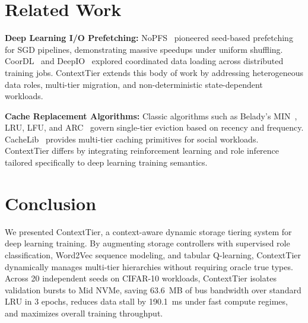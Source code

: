 \documentclass[conference]{IEEEtran}
\begin{document}
\section{Related Work}
\label{sec:related}
\textbf{Deep Learning I/O Prefetching:} NoPFS~\cite{dryden2021clairvoyant} pioneered seed-based prefetching for SGD pipelines, demonstrating massive speedups under uniform shuffling. CoorDL~\cite{coordl2021} and DeepIO~\cite{zhu2018deepio} explored coordinated data loading across distributed training jobs. ContextTier extends this body of work by addressing heterogeneous data roles, multi-tier migration, and non-deterministic state-dependent workloads.

\textbf{Cache Replacement Algorithms:} Classic algorithms such as Belady's MIN~\cite{belady1966study}, LRU, LFU, and ARC~\cite{megiddo2003arc} govern single-tier eviction based on recency and frequency. CacheLib~\cite{cachelib2020} provides multi-tier caching primitives for social workloads. ContextTier differs by integrating reinforcement learning and role inference tailored specifically to deep learning training semantics.

\section{Conclusion}
\label{sec:conclusion}
We presented ContextTier, a context-aware dynamic storage tiering system for deep learning training. By augmenting storage controllers with supervised role classification, Word2Vec sequence modeling, and tabular Q-learning, ContextTier dynamically manages multi-tier hierarchies without requiring oracle true types. Across 20 independent seeds on CIFAR-10 workloads, ContextTier isolates validation bursts to Mid NVMe, saving 63.6~MB of bus bandwidth over standard LRU in 3 epochs, reduces data stall by 190.1~ms under fast compute regimes, and maximizes overall training throughput.



\end{document}
